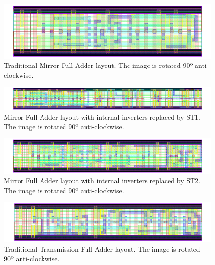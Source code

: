 \documentclass[pgmicro,diss,english]{iiufrgs}
\begin{document}
\begin{figure}[]
\centering
\includegraphics[width=1.5\textwidth, angle =90]{CMOS.png}
\caption{Traditional Mirror Full Adder layout. The image is rotated 90º anti-clockwise.}
\label{fig:CMOS}
\end{figure}

\newpage
\begin{figure}[]
\centering
\includegraphics[width=1.5\textwidth, angle =90]{CMOSST1.png}
\caption{Mirror Full Adder layout with internal inverters replaced by ST1. The image is rotated 90º anti-clockwise.}
\label{fig:CMOSST1}
\end{figure}

\newpage
\begin{figure}[]
\centering
\includegraphics[width=1.5\textwidth, angle =90]{CMOSST2.png}
\caption{Mirror Full Adder layout with internal inverters replaced by ST2. The image is rotated 90º anti-clockwise.}
\label{fig:CMOSST2}
\end{figure}





\newpage
\begin{figure}[]
\centering
\includegraphics[width=1.5\textwidth, angle =90]{TFA.png}
\caption{Traditional Transmission Full Adder layout. The image is rotated 90º anti-clockwise.}
\label{fig:TFA}
\end{figure}
\end{document}
